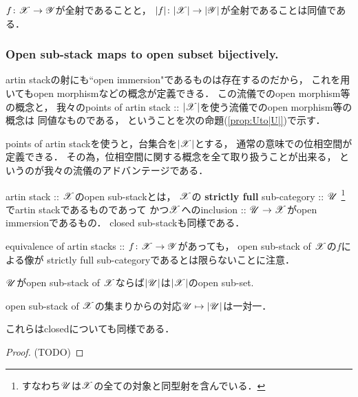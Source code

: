 \documentclass[a4paper, dvipdfmx]{jsarticle}
\begin{document}
\begin{Lemma}
    $f \colon \mathscr{X} \to \mathscr{Y}$が全射であることと，
    $|f|\colon |\mathscr{X}| \to |\mathscr{Y}|$が全射であることは同値である．
\end{Lemma}

\subsubsection{Open sub-stack maps to open subset bijectively.}
\begin{Remark}
    artin stackの射にも``open immersion"であるものは存在するのだから，
    これを用いてもopen morphismなどの概念が定義できる．
    この流儀でのopen morphism等の概念と，
    我々のpoints of artin stack :: $|\mathscr{X}|$を使う流儀でのopen morphism等の概念は
    同値なものである，
    ということを次の命題(\ref{prop:Uto|U|})で示す．

    points of artin stackを使うと，台集合を$|\mathscr{X}|$とする，
    通常の意味での位相空間が定義できる．
    その為，位相空間に関する概念を全て取り扱うことが出来る，
    というのが我々の流儀のアドバンテージである．
\end{Remark}

\begin{Def}[\cite{SP} 04YM]
    artin stack :: $\mathscr{X}$のopen sub-stackとは，
    $\mathscr{X}$の \textbf{strictly full} sub-category :: $\mathscr{U}$
    \footnote{ すなわち$\mathscr{U}$は$\mathscr{X}$の全ての対象と同型射を含んでいる． }
    でartin stackであるものであって
    かつ$\mathscr{X}$へのinclusion :: $\mathscr{U} \to \mathscr{X}$がopen immersionであるもの．
    closed sub-stackも同様である．
\end{Def}

\begin{Remark}
    equivalence of artin stacks :: $f \colon \mathscr{X} \to \mathscr{Y}$があっても，
    open sub-stack of $\mathscr{X}$の$f$による像が
    strictly full sub-categoryであるとは限らないことに注意．
\end{Remark}

\begin{Prop}\label{prop:Uto|U|}
\begin{myenum}
    \item $\mathscr{U}$がopen sub-stack of $\mathscr{X}$ならば$|\mathscr{U}|$は$|\mathscr{X}|$のopen sub-set.
    \item open sub-stack of $\mathscr{X}$の集まりからの対応$\mathscr{U} \mapsto |\mathscr{U}|$は一対一．
\end{myenum}
    これらはclosedについても同様である．
\end{Prop}
\begin{proof}
    (TODO)
\end{proof}
\end{document}
